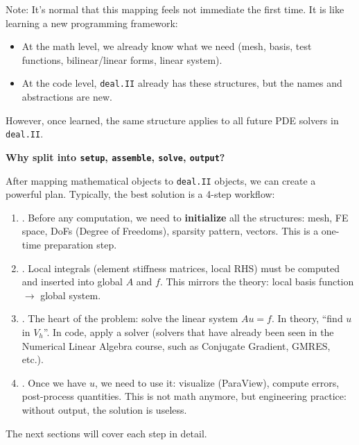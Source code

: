 \newpage

\noindent
Note: It's normal that this mapping feels not immediate the first time. It is like learning a new programming framework:
\begin{itemize}
    \item At the math level, we already know what we need (mesh, basis, test functions, bilinear/linear forms, linear system).
    \item At the code level, \texttt{deal.II} already has these structures, but the names and abstractions are new.
\end{itemize}
However, once learned, the same structure applies to all future PDE solvers in \texttt{deal.II}.

\highspace
\begin{flushleft}
    \textcolor{Green3}{ \textbf{Why split into \texttt{setup}, \texttt{assemble}, \texttt{solve}, \texttt{output}?}}
\end{flushleft}
After mapping mathematical objects to \texttt{deal.II} objects, we can create a powerful plan. Typically, the best solution is a 4-step workflow:
\begin{enumerate}
    \item {}. Before any computation, we need to \textbf{initialize} all the structures: mesh, FE space, DoFs (Degree of Freedoms), sparsity pattern, vectors. This is a one-time preparation step.
    \item {}. Local integrals (element stiffness matrices, local RHS) must be computed and inserted into global $A$ and $f$. This mirrors the theory: local basis function $\rightarrow$ global system.
    \item {}. The heart of the problem: solve the linear system $Au = f$. In theory, ``find $u$ in $V_h$''. In code, apply a solver (solvers that have already been seen in the Numerical Linear Algebra course, such as Conjugate Gradient, GMRES, etc.).
    \item {}. Once we have $u$, we need to use it: visualize (ParaView), compute errors, post-process quantities. This is not math anymore, but engineering practice: without output, the solution is useless.
\end{enumerate}
The next sections will cover each step in detail.

\newpage

